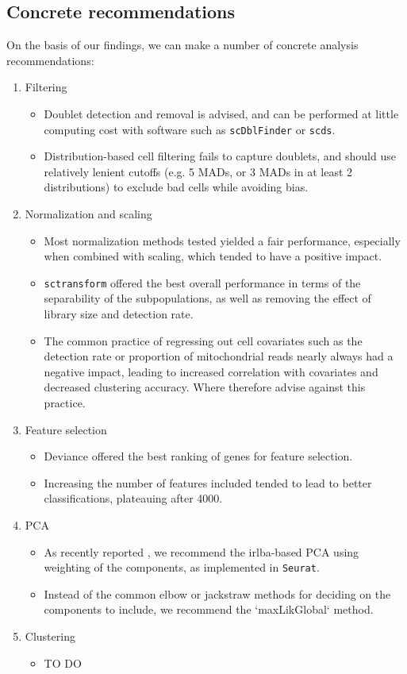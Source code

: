 \documentclass{bmcart}
\begin{document}
\subsection*{Concrete recommendations}

On the basis of our findings, we can make a number of concrete analysis recommendations:

\begin{enumerate}
   \item Filtering
   \begin{itemize}
     \item Doublet detection and removal is advised, and can be performed at little computing cost with software such as \texttt{scDblFinder} or \texttt{scds}.
     \item Distribution-based cell filtering fails to capture doublets, and should use relatively lenient cutoffs (e.g. 5 MADs, or 3 MADs in at least 2 distributions) to exclude bad cells while avoiding bias.
   \end{itemize}
   \item Normalization and scaling
   \begin{itemize}
     \item Most normalization methods tested yielded a fair performance, especially when combined with scaling, which tended to have a positive impact.
     \item \texttt{sctransform} offered the best overall performance in terms of the separability of the subpopulations, as well as removing the effect of library size and detection rate.
     \item The common practice of regressing out cell covariates such as the detection rate or proportion of mitochondrial reads nearly always had a negative impact, leading to increased correlation with covariates and decreased clustering accuracy. Where therefore advise against this practice.
   \end{itemize}
   \item Feature selection
   \begin{itemize}
     \item Deviance \citep{townesGlmpca2019} offered the best ranking of genes for feature selection.
     \item Increasing the number of features included tended to lead to better classifications, plateauing after 4000.
   \end{itemize}
   \item PCA
   \begin{itemize}
     \item As recently reported \citep{SunDimRed2019}, we recommend the irlba-based PCA using weighting of the components, as implemented in \texttt{Seurat}. 
     \item Instead of the common elbow or jackstraw methods for deciding on the components to include, we recommend the `maxLikGlobal` method.
   \end{itemize}
   \item Clustering
   \begin{itemize}
     \item TO DO
   \end{itemize}
\end{enumerate}
\end{document}
